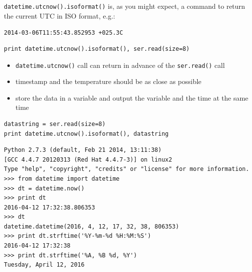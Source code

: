 \documentclass[aspectratio=1610,9pt]{beamer} %
\begin{document}
\begin{frame}[fragile]

\texttt{datetime.utcnow().isoformat()} is, as you might expect, a
command to return the current UTC in ISO format, e.g.:

\texttt{2014-03-06T11:55:43.852953 +025.3C}

\begin{verbatim}
print datetime.utcnow().isoformat(), ser.read(size=8) 
\end{verbatim}

\begin{itemize}
\itemsep1pt\parskip0pt
\item
  \texttt{datetime.utcnow()} call can return in advance of the
  \texttt{ser.read()} call
\item
  timestamp and the temperature should be as close as possible
\item
  store the data in a variable and output the variable and the time at
  the same time
\end{itemize}

\begin{verbatim}
datastring = ser.read(size=8)
print datetime.utcnow().isoformat(), datastring
\end{verbatim}

\end{frame}
\begin{frame}[fragile]
\begin{verbatim}
Python 2.7.3 (default, Feb 21 2014, 13:11:38) 
[GCC 4.4.7 20120313 (Red Hat 4.4.7-3)] on linux2
Type "help", "copyright", "credits" or "license" for more information.
>>> from datetime import datetime
>>> dt = datetime.now()
>>> print dt
2016-04-12 17:32:38.806353
>>> dt
datetime.datetime(2016, 4, 12, 17, 32, 38, 806353)
>>> print dt.strftime('%Y-%m-%d %H:%M:%S')
2016-04-12 17:32:38
>>> print dt.strftime('%A, %B %d, %Y')
Tuesday, April 12, 2016
\end{verbatim}

\end{frame}
\end{document}
